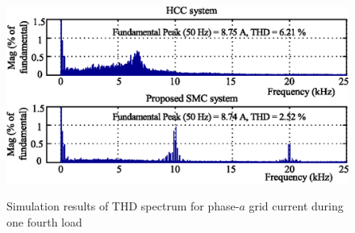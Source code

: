 \begin{figure}[h!]
		\centering
		\includegraphics[scale=0.9]{figures/Chapter_4/Mine/SimTHD2.eps}\\
		\label{4.SimTHD2}
	\caption{Simulation results of THD spectrum for phase-$a$ grid current during one fourth load} 
	\label{fig4.81}
\end{figure}
 
